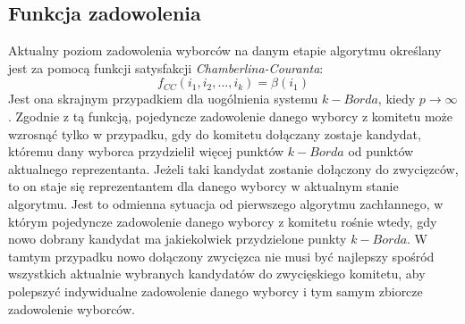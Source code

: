 \documentclass[pdflatex,11pt]{../aghdoc_version2}
\begin{document}
\subsection{Funkcja zadowolenia}
Aktualny poziom zadowolenia wyborców na danym etapie algorytmu określany jest za
pomocą funkcji satysfakcji \textit{Chamberlina-Couranta}:
\begin{equation}
f_{CC}(i_1, i_2, ..., i_k) = \beta(i_1)
\end{equation}
Jest ona skrajnym przypadkiem dla uogólnienia systemu $k-Borda$, kiedy $p \to \infty$. Zgodnie z tą
funkcją, pojedyncze zadowolenie danego wyborcy z komitetu może wzrosnąć tylko w
przypadku, gdy do komitetu dołączany zostaje kandydat, któremu dany wyborca przydzielił
więcej punktów $k-Borda$ od punktów aktualnego reprezentanta. Jeżeli taki kandydat zostanie
dołączony do zwycięzców, to on staje się reprezentantem dla danego wyborcy w aktualnym
stanie algorytmu. Jest to odmienna sytuacja od pierwszego algorytmu zachłannego, w
którym pojedyncze zadowolenie danego wyborcy z komitetu rośnie wtedy, gdy nowo
dobrany kandydat ma jakiekolwiek przydzielone punkty $k-Borda$. W tamtym przypadku nowo
dołączony zwycięzca nie musi być najlepszy spośród wszystkich aktualnie wybranych
kandydatów do zwycięskiego komitetu, aby polepszyć indywidualne zadowolenie danego
wyborcy i tym samym zbiorcze zadowolenie wyborców.
\end{document}
